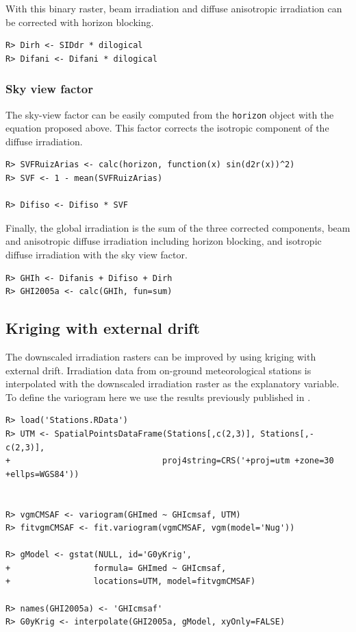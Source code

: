 \documentclass[11pt, english]{article}
\let\cite\citep
\begin{document}
With this binary raster, beam irradiation and diffuse anisotropic
irradiation can be corrected with horizon blocking.
\lstset{language=R,numbers=none}
\begin{lstlisting} 
R> Dirh <- SIDdr * dilogical
R> Difani <- Difani * dilogical
\end{lstlisting}

\subsubsection{Sky view factor}
\label{sec-1-5-3}

The sky-view factor can be easily computed from the \texttt{horizon}
object with the equation proposed above. This factor corrects the
isotropic component of the diffuse irradiation.

\lstset{language=R,numbers=none}
\begin{lstlisting} 
R> SVFRuizArias <- calc(horizon, function(x) sin(d2r(x))^2)
R> SVF <- 1 - mean(SVFRuizArias)

R> Difiso <- Difiso * SVF
\end{lstlisting}

Finally, the global irradiation is the sum of the three corrected
components, beam and anisotropic diffuse irradiation including horizon
blocking, and isotropic diffuse irradiation with the sky view factor.

\lstset{language=R,numbers=none}
\begin{lstlisting} 
R> GHIh <- Difanis + Difiso + Dirh
R> GHI2005a <- calc(GHIh, fun=sum)
\end{lstlisting}

\subsection{Kriging with external drift}
\label{sec-1-6}

The downscaled irradiation rasters can be improved by using kriging
with external drift. Irradiation data from on-ground meteorological
stations is interpolated with the downscaled irradiation raster as the
explanatory variable. To define the variogram here we use the results
previously published in \cite{Antonanzas-Torres.Canizares.ea2013}.

\lstset{language=R,numbers=none}
\begin{lstlisting} 
R> load('Stations.RData')
R> UTM <- SpatialPointsDataFrame(Stations[,c(2,3)], Stations[,-c(2,3)],
+                               proj4string=CRS('+proj=utm +zone=30 +ellps=WGS84'))


R> vgmCMSAF <- variogram(GHImed ~ GHIcmsaf, UTM)
R> fitvgmCMSAF <- fit.variogram(vgmCMSAF, vgm(model='Nug'))

R> gModel <- gstat(NULL, id='G0yKrig',
+                 formula= GHImed ~ GHIcmsaf,
+                 locations=UTM, model=fitvgmCMSAF)

R> names(GHI2005a) <- 'GHIcmsaf'
R> G0yKrig <- interpolate(GHI2005a, gModel, xyOnly=FALSE)
\end{lstlisting}
\end{document}
